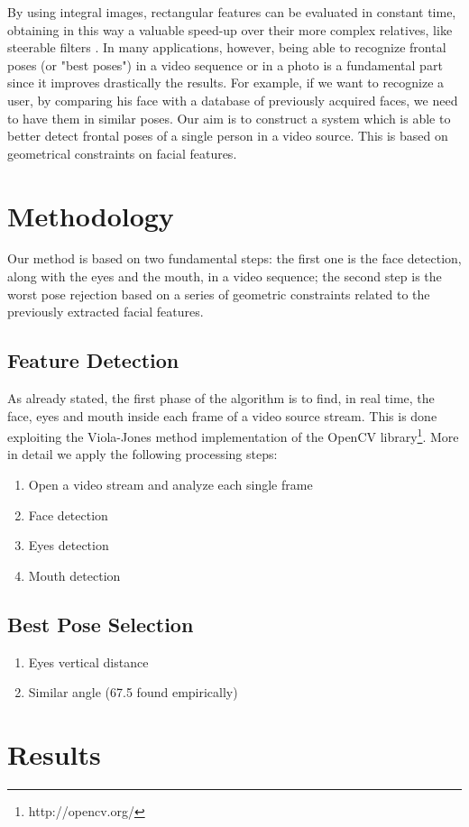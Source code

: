 \documentclass[10pt,a4paper]{report}
\begin{document}
By using integral images, rectangular features can be evaluated in constant time, obtaining in this way a valuable speed-up over their more complex relatives, like steerable filters \cite{steerable}.
In many applications, however, being able to recognize frontal poses (or "best poses") in a video sequence or in a photo is a fundamental part since it improves drastically the results. For example, if we want to recognize a user, by comparing his face with a database of previously acquired faces, we need to have them in similar poses.
Our aim is to construct a system which is able to better detect frontal poses of a single person in a video source. This is based on geometrical constraints on facial features.

\section*{Methodology}
Our method is based on two fundamental steps: the first one is the face detection, along with the eyes and the mouth, in a video sequence; the second step is the worst pose rejection based on a series of geometric constraints related to the previously extracted facial features.
\subsection*{Feature Detection}
As already stated, the first phase of the algorithm is to find, in real time, the face, eyes and mouth inside each frame of a video source stream. This is done exploiting the Viola-Jones method implementation of the OpenCV library\footnote{http://opencv.org/}. More in detail we apply the following processing steps:
\begin{enumerate}
\item Open a video stream and analyze each single frame
\item Face detection
\item Eyes detection
\item Mouth detection
\end{enumerate} 
\subsection*{Best Pose Selection}
\begin{enumerate}
\item Eyes vertical distance
\item Similar angle (67.5 found empirically)
\end{enumerate}
\section*{Results}
\end{document}

